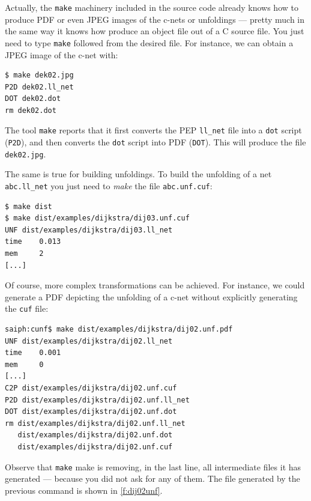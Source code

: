 \documentclass[a4paper]{refart}
\begin{document}
Actually, the \verb!make! machinery included in the source code already
knows how to produce PDF or even JPEG images of the c-nets
or unfoldings --- pretty much in the same way it knows how produce an
object file out of a C source file.
You just need to type \verb!make! followed from the desired file.
For instance, we can obtain a JPEG image of the c-net with:
\begin{verbatim}
$ make dek02.jpg
P2D dek02.ll_net
DOT dek02.dot
rm dek02.dot
\end{verbatim}
The tool \verb!make! reports that it first converts
the PEP \verb!ll_net! file into a \verb!dot! script (\verb!P2D!),
and then converts the \verb!dot! script into PDF (\verb!DOT!).
This will produce the file \verb!dek02.jpg!.

The same is true for building unfoldings.  To build the unfolding of a net
\verb!abc.ll_net! you just need to \textit{make} the file
\verb!abc.unf.cuf!:
\begin{verbatim}
$ make dist
$ make dist/examples/dijkstra/dij03.unf.cuf
UNF dist/examples/dijkstra/dij03.ll_net
time    0.013
mem     2
[...]
\end{verbatim}
Of course, more complex transformations can be achieved.  For instance, we
could generate a PDF depicting the unfolding of a c-net without
explicitly generating the \verb!cuf! file:
\begin{verbatim}
saiph:cunf$ make dist/examples/dijkstra/dij02.unf.pdf
UNF dist/examples/dijkstra/dij02.ll_net
time    0.001
mem     0
[...]
C2P dist/examples/dijkstra/dij02.unf.cuf
P2D dist/examples/dijkstra/dij02.unf.ll_net
DOT dist/examples/dijkstra/dij02.unf.dot
rm dist/examples/dijkstra/dij02.unf.ll_net
   dist/examples/dijkstra/dij02.unf.dot
   dist/examples/dijkstra/dij02.unf.cuf
\end{verbatim}
Observe that \verb!make! make is removing, in the last line, all
intermediate files it has generated --- because you did not ask for any of
them.  The file generated by the previous command is shown in
\cref{f:dij02unf}.
\end{document}
